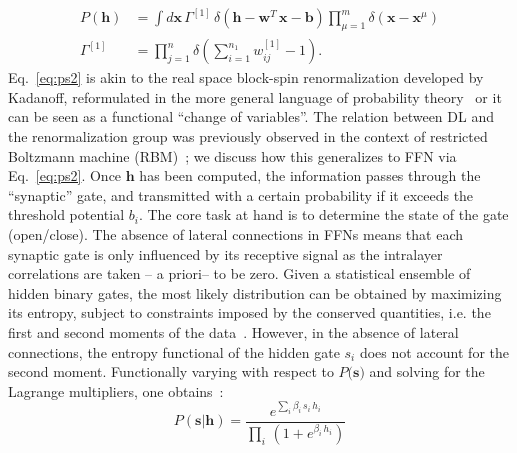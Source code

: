 \documentclass{article}
\begin{document}
%
\begin{align} \label{eq:ps2}
P(\mathbf{h}) &= \int {d\mathbf{x}} \, \Gamma^{[1]} \, \delta\left( \mathbf{h} -  \mathbf{w}^{T} \, \mathbf{x} - \mathbf{b} \right) \prod_{\mu =1}^m  \delta ( \mathbf{x} - \mathbf{x}^{\mu} ) \\ \nonumber
\Gamma^{[1]} &= \prod_{j=1}^n \delta\left( \sum_{i=1}^{n_1} w_{ij}^{[1]} -1 \right).
\end{align}
%
Eq.~\eqref{eq:ps2} is akin to the real space block-spin renormalization developed by Kadanoff, reformulated in the more general language of probability theory~\cite{roberto, ma, cassandro} or it can be seen as a functional ``change of variables''. The relation between  DL and the renormalization group was previously observed in the context of restricted Boltzmann machine (RBM)~\cite{mehta}; we discuss how this generalizes to FFN via Eq.~\eqref{eq:ps2}. Once $\mathbf{h}$ has been computed, the information passes through the ``synaptic'' gate, and transmitted with a certain probability if it exceeds the threshold potential $b_i$. The core task at hand is to determine the state of the gate (open/close). The absence of lateral connections in FFNs means that each synaptic gate is only influenced by its receptive signal as the intralayer correlations are taken -- a priori-- to be zero. Given a statistical ensemble of hidden binary gates, the most likely distribution  can be obtained by maximizing its entropy, subject to constraints imposed by the conserved quantities, i.e. the first and second moments of the data~\cite{zecchina, mckay}. However, in the absence of lateral connections, the entropy functional of the hidden gate $s_i$ does not account for the second moment.
%
%
Functionally varying with respect to $P(\mathbf{s)}$ and solving for the Lagrange multipliers, one  obtains~\cite{roberto}:
%
%
\begin{equation} \label{eq:entropy4}
P(\mathbf{s} | \mathbf{h}) = \frac{e^{ \sum_i \beta_i  \, s_i \, h_i }}{\prod_i \, \left( 1+ e^{\beta_i \, h_i} \right)} %
\end{equation}
%
\end{document}
